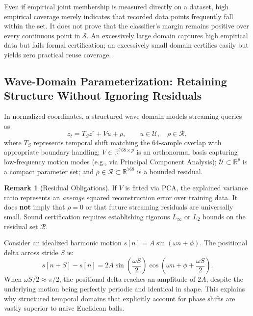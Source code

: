 \documentclass[11pt,a4paper]{article}
\newcommand{\R}{\mathbb R}
\theoremstyle{definition}
\newtheorem{remark}[proposition]{Remark}
\begin{document}
Even if empirical joint membership is measured directly on a dataset, high empirical coverage merely indicates that recorded data points frequently fall within the set. It does not prove that the classifier's margin remains positive over every continuous point in $\mathcal{S}$. An excessively large domain captures high empirical data but fails formal certification; an excessively small domain certifies easily but yields zero practical reuse coverage.

\subsection{Wave-Domain Parameterization: Retaining Structure Without Ignoring Residuals}
In normalized coordinates, a structured wave-domain models streaming queries as:
\begin{equation}
z_t = T_S z^r + V u + \rho, \qquad u \in \mathcal{U}, \quad \rho \in \mathcal{R},
\end{equation}
where $T_S$ represents temporal shift matching the 64-sample overlap with appropriate boundary handling; $V \in \R^{768 \times p}$ is an orthonormal basis capturing low-frequency motion modes (e.g., via Principal Component Analysis); $\mathcal{U} \subset \R^p$ is a compact parameter set; and $\rho \in \mathcal{R} \subset \R^{768}$ is a bounded residual.

\begin{remark}[Residual Obligations]
If $V$ is fitted via PCA, the explained variance ratio represents an \emph{average} squared reconstruction error over training data. It does \textbf{not} imply that $\rho = 0$ or that future streaming residuals are universally small. Sound certification requires establishing rigorous $L_\infty$ or $L_2$ bounds on the residual set $\mathcal{R}$.
\end{remark}

Consider an idealized harmonic motion $s[n] = A \sin(\omega n + \phi)$. The positional delta across stride $S$ is:
\begin{equation}
s[n+S] - s[n] = 2 A \sin\left(\frac{\omega S}{2}\right) \cos\left(\omega n + \phi + \frac{\omega S}{2}\right).
\end{equation}
When $\omega S / 2 \approx \pi / 2$, the positional delta reaches an amplitude of $2A$, despite the underlying motion being perfectly periodic and identical in shape. This explains why structured temporal domains that explicitly account for phase shifts are vastly superior to naive Euclidean balls.
\end{document}
